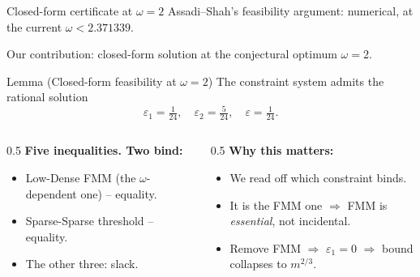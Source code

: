 \documentclass[aspectratio=169,10pt]{beamer}
\begin{document}
\begin{frame}{Closed-form certificate at \texorpdfstring{$\omega = 2$}{omega = 2}}
  Assadi--Shah's feasibility argument: numerical, at the current $\omega < 2.371339$.

  \vspace{0.4em}
  \alert{Our contribution:} closed-form solution at the conjectural optimum $\omega = 2$.

  \vspace{0.4em}
  \begin{block}{Lemma (Closed-form feasibility at $\omega = 2$)}
    The constraint system admits the rational solution
    \[
      \varepsilon_1 = \tfrac{1}{24}, \quad
      \varepsilon_2 = \tfrac{5}{24}, \quad
      \varepsilon = \tfrac{1}{24}.
    \]
  \end{block}

  \vspace{0.4em}
  \begin{columns}[T]
    \begin{column}{0.5\textwidth}
      \textbf{Five inequalities. Two bind:}
      \begin{itemize}
        \item Low-Dense FMM (the $\omega$-dependent one) -- \alert{equality}.
        \item Sparse-Sparse threshold -- \alert{equality}.
        \item The other three: slack.
      \end{itemize}
    \end{column}
    \begin{column}{0.5\textwidth}
      \textbf{Why this matters:}
      \begin{itemize}
        \item We read off \alert{which} constraint binds.
        \item It is the FMM one $\Rightarrow$ FMM is \emph{essential}, not incidental.
        \item Remove FMM $\Rightarrow$ $\varepsilon_1 = 0$ $\Rightarrow$ bound collapses to $m^{2/3}$.
      \end{itemize}
    \end{column}
  \end{columns}
\end{frame}

\end{document}
